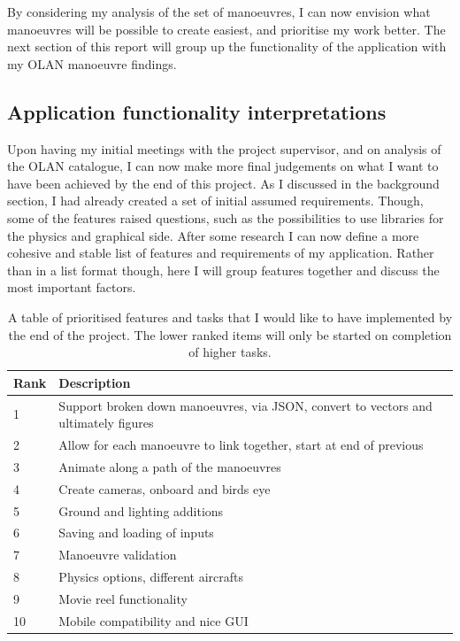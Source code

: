 By considering my analysis of the set of manoeuvres, I can now envision what manoeuvres will be possible to create easiest, and prioritise my work better. The next section of this report will group up the functionality of the application with my OLAN manoeuvre findings.

\subsection{Application functionality interpretations}
Upon having my initial meetings with the project supervisor, and on analysis of the OLAN catalogue, I can now make more final judgements on what I want to have been achieved by the end of this project. As I discussed in the background section, I had already created a set of initial assumed requirements. Though, some of the features raised questions, such as the possibilities to use libraries for the physics and graphical side. After some research I can now define a more cohesive and stable list of features and requirements of my application. Rather than in a list format though, here I will group features together and discuss the most important factors.

\begin{table}[h]
\caption{A table of prioritised features and tasks that I would like to have implemented by the end of the project. The lower ranked items will only be started on completion of higher tasks.}
 \label{tbl:rank-table}
\begin{tabular}{|l|l|}
\hline
\textbf{Rank} & \textbf{Description}                                                                \\ \hline
1             & Support broken down manoeuvres, via JSON, convert to vectors and ultimately figures \\ \hline
2             & Allow for each manoeuvre to link together, start at end of previous                 \\ \hline
3             & Animate along a path of the manoeuvres                                              \\ \hline
4             & Create cameras, onboard and birds eye                                               \\ \hline
5             & Ground and lighting additions                                                       \\ \hline
6             & Saving and loading of inputs                                                        \\ \hline
7             & Manoeuvre validation                                                                \\ \hline
8             & Physics options, different aircrafts                                                \\ \hline
9             & Movie reel functionality                                                            \\ \hline
10            & Mobile compatibility and nice GUI                                                   \\ \hline
\end{tabular}
\end{table}

